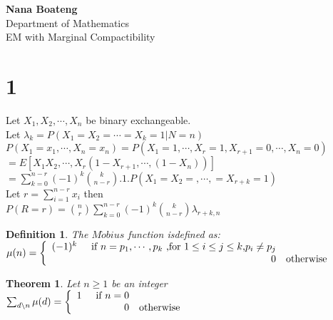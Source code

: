 \documentclass{article}\usepackage[]{graphicx}\usepackage[]{color}
\newtheorem{theorem}{Theorem}
\begin{document}

\begin{center}
{\Large {\bf Nana Boateng}} \\
\vspace{5mm}
{\Large Department of Mathematics} \\
\vspace{5mm}
\vspace{5mm}
{\Large EM with Marginal Compactibility} \\
\end{center}

\section{1}
Let $X_{1},X_{2},\cdots,X_{n}$ be binary exchangeable. \\
Let $\lambda_{k}=P(X_{1}=X_{2}=\cdots=X_{k}=1|N=n)$\\

$P(X_{1}=x_{1},\cdots,X_{n}=x_{n})=P(X_{1}=1,\cdots,X_{r}=1,X_{r+1}=0,\cdots,X_{n}=0)$\\

$=E[X_{1}X_{2},\cdots,X_{r}(1-X_{r+1},\cdots,(1-X_{n}))]$\\

$=\sum_{k=0}^{n-r}(-1)^{k}\binom{k}{n-r}.1.P(X_{1}=X_{2}=,\cdots,=X_{r+k}=1)$\\

Let $r=\sum_{i=1}^{n-r}x_{i}$ then\\

$P(R=r)=\binom{n}{r}\sum_{k=0}^{n-r}(-1)^{k}\binom{k}{n-r}\lambda_{r+k,n}$\\

\newtheorem{mydef}{Definition}
\begin{mydef}
The $M\ddot{o}bius$ function isdefined as:\\
$\mu(n) = \left\{ \begin{array}{rcl}
(-1)^{k}   \mbox{\hspace{5mm}if  $n=p_{1},\cdots,p_{k}$ ,for $1\leq i \leq j \leq k$,$p_{i} \neq p_{j}$}
& \\ 0& \mbox{otherwise}  &\\

\end{array}\right.$\\
\end{mydef}

\begin{theorem}

Let $n\geq 1$ be an integer\\

$\sum_{d \setminus n}\mu(d) = \left\{ \begin{array}{rcl}
1   \mbox{\hspace{5mm}if  $n=0$}
& \\ 0& \mbox{otherwise } &\\

\end{array}\right.$\\
\end{theorem}
\end{document}
